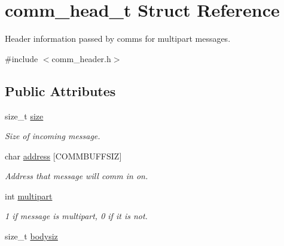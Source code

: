 \hypertarget{structcomm__head__t}{}\section{comm\+\_\+head\+\_\+t Struct Reference}
\label{structcomm__head__t}


Header information passed by comms for multipart messages.  




{\ttfamily \#include $<$comm\+\_\+header.\+h$>$}

\subsection*{Public Attributes}
\begin{DoxyCompactItemize}
\item 
\mbox{\label{structcomm__head__t_a61721f46c3f5850a5e65e28d497da0fb}} 
size\+\_\+t \mbox{\hyperlink{structcomm__head__t_a61721f46c3f5850a5e65e28d497da0fb}{size}}
\begin{DoxyCompactList}\small\item\em Size of incoming message. \end{DoxyCompactList}\item 
\mbox{\label{structcomm__head__t_af762f3a390be988bb2f9dca01a7b5bb5}} 
char \mbox{\hyperlink{structcomm__head__t_af762f3a390be988bb2f9dca01a7b5bb5}{address}} \mbox{[}C\+O\+M\+M\+B\+U\+F\+F\+S\+IZ\mbox{]}
\begin{DoxyCompactList}\small\item\em Address that message will comm in on. \end{DoxyCompactList}\item 
\mbox{\label{structcomm__head__t_a6f14ffcda4738e5e4b498b05a802f293}} 
int \mbox{\hyperlink{structcomm__head__t_a6f14ffcda4738e5e4b498b05a802f293}{multipart}}
\begin{DoxyCompactList}\small\item\em 1 if message is multipart, 0 if it is not. \end{DoxyCompactList}\item 
\mbox{\label{structcomm__head__t_a981bda83ada0637a0153dcd6c46420f0}} 
size\+\_\+t \mbox{\hyperlink{structcomm__head__t_a981bda83ada0637a0153dcd6c46420f0}{bodysiz}}

\end{DoxyCompactItemize}
